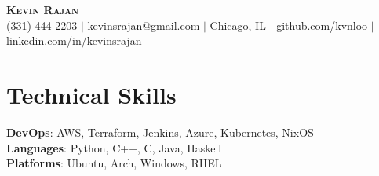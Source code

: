\documentclass[letterpaper,11pt]{article}
\begin{document}
\begin{center}
    \textbf{\Huge \scshape Kevin Rajan} \\ \vspace{1pt}
    \small (331) 444-2203 $|$
    \href{mailto:kevinsrajan@gmail.com}{\underline{kevinsrajan@gmail.com}} $|$
    Chicago, IL $|$
    \href{https://github.com/kvnloo}{\underline{github.com/kvnloo}} $|$
    \href{https://linkedin.com/in/kevinsrajan}{\underline{linkedin.com/in/kevinsrajan}}
\end{center}

\section{Technical Skills}
 \begin{itemize}[leftmargin=0.15in, label={}]
    \small{\item{
     \textbf{DevOps}{: AWS, Terraform, Jenkins, Azure, Kubernetes, NixOS} \\
     \textbf{Languages}{: Python, C++, C, Java, Haskell} \\
     \textbf{Platforms}{: Ubuntu, Arch, Windows, RHEL}
    }}
 \end{itemize}
\end{document}
